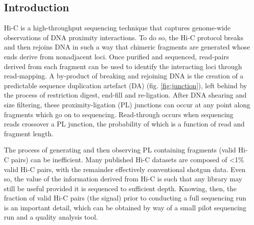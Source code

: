 \documentclass[a0,landscape]{a0poster}
\begin{document}


\begin{multicols}{4} %


\color{DarkSlateGray} %

\section*{Introduction}

Hi-C is a high-throughput sequencing technique that captures genome-wide observations of DNA proximity interactions. To do so, the Hi-C protocol breaks and then rejoins DNA in such a way that chimeric fragments are generated whose ends derive from nonadjacent loci. Once purified and sequenced, read-pairs derived from each fragment can be used to identify the interacting loci through read-mapping. A by-product of breaking and rejoining DNA is the creation of a predictable sequence duplication artefact (DA) (fig. \ref{fig:junction}), left behind by the process of restriction digest, end-fill and re-ligation. After DNA shearing and size filtering, these proximity-ligation (PL) junctions can occur at any point along fragments which go on to sequencing. Read-through occurs when sequencing reads crossover a PL junction, the probability of which is a function of read and fragment length. 

The process of generating and then observing PL containing fragments (valid Hi-C pairs) can be inefficient. Many published Hi-C datasets are composed of <1\% valid Hi-C pairs, with the remainder effectively conventional shotgun data. Even so, the value of the information derived from Hi-C is such that any library may still be useful provided it is sequenced to sufficient depth. Knowing, then, the fraction of valid Hi-C pairs (the signal) prior to conducting a full sequencing run is an important detail, which can be obtained by way of a small pilot sequencing run and a quality analysis tool. 


\end{multicols}
\end{document}
